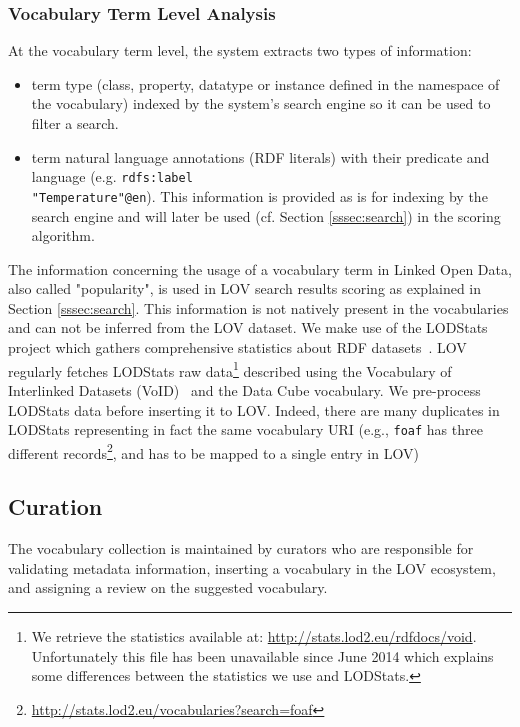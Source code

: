 \documentclass{iosart2c}
\begin{document}
\subsubsection{Vocabulary Term Level Analysis}
At the vocabulary term level, the system extracts two types of information:
\begin{itemize}
\item term type (class, property, datatype or instance defined in the namespace of the vocabulary) indexed by the system's search engine so it can be used to filter a search.
\item term natural language annotations (RDF literals) with their predicate and language (e.g. {\small\texttt{rdfs:label}}\\ {\small\texttt{"Temperature"@en}}). This information is provided as is for indexing by the search engine and will later be used (cf. Section \ref{sssec:search}) in the scoring algorithm.
\end{itemize}

The information concerning the usage  of a vocabulary term in Linked Open Data, also called "popularity", is used in LOV search results scoring as explained in Section \ref{sssec:search}. This information is not natively present in the vocabularies and can not be inferred from the LOV dataset. We make use of the LODStats project which gathers comprehensive statistics about RDF datasets~\cite{demter-2012-ekaw}. LOV regularly fetches LODStats raw data\footnote{We retrieve the statistics available at: \url{http://stats.lod2.eu/rdfdocs/void}. Unfortunately this file has been unavailable since June 2014 which explains some differences between the statistics we use and LODStats.} described using the Vocabulary of Interlinked Datasets (VoID)~\cite{void2009} and the Data Cube vocabulary. We pre-process LODStats data before inserting it to LOV. Indeed, there are many duplicates in LODStats representing in fact the same vocabulary URI (e.g., \texttt{foaf} has three different records\footnote{\url{http://stats.lod2.eu/vocabularies?search=foaf}}, and has to be mapped to a single entry in LOV)


\subsection{Curation}
The vocabulary collection is maintained by curators who are responsible for validating metadata information, inserting a vocabulary in the LOV ecosystem, and assigning a review on the suggested vocabulary. 
\end{document}
